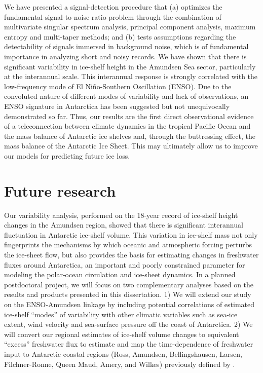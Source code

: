 We have presented a signal-detection procedure that (a) optimizes the fundamental signal-to-noise ratio problem through the combination of multivariate singular spectrum analysis, principal component analysis, maximum entropy and multi-taper methods; and (b) tests assumptions regarding the detectability of signals immersed in background noise, which is of fundamental importance in analyzing short and noisy records. We have shown that there is significant variability in ice-shelf height in the Amundsen Sea sector, particularly at the interannual scale. This interannual response is strongly correlated with the low-frequency mode of El Ni\~no-Southern Oscillation (ENSO). Due to the convoluted nature of different modes of variability and lack of observations, an ENSO signature in Antarctica has been suggested but not unequivocally demonstrated so far. Thus, our results are the first direct observational evidence of a teleconnection between climate dynamics in the tropical Pacific Ocean and the mass balance of Antarctic ice shelves and, through the buttressing effect, the mass balance of the Antarctic Ice Sheet. This may ultimately allow us to improve our models for predicting future ice loss.

\section{Future research}

Our variability analysis, performed on the 18-year record of ice-shelf height changes in the Amundsen region, showed that there is significant interannual fluctuation in Antarctic ice-shelf volume. This variation in ice-shelf mass not only fingerprints the mechanisms by which oceanic and atmospheric forcing perturbs the ice-sheet flow, but also provides the basis for estimating changes in freshwater fluxes around Antarctica, an important and poorly constrained parameter for modeling the polar-ocean circulation and ice-sheet dynamics. In a planned postdoctoral project, we will focus on two complementary analyses based on the results and products presented in this dissertation. 1) We will extend our study on the ENSO-Amundsen linkage by including potential correlations of estimated ice-shelf ``modes'' of variability with other climatic variables such as sea-ice extent, wind velocity and sea-surface pressure off the coast of Antarctica. 2) We will convert our regional estimates of ice-shelf volume changes to equivalent ``excess'' freshwater flux to estimate and map the time-dependence of freshwater input to Antarctic coastal regions (Ross, Amundsen, Bellingshausen, Larsen, Filchner-Ronne, Queen Maud, Amery, and Wilkes) previously defined by \textcite{Paolo2015}. 
